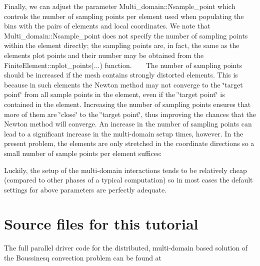 \begin{DoxyItemize}
\item Finally, we can adjust the parameter {\ttfamily Multi\+\_\+domain\+::\+Nsample\+\_\+point} which controls the number of sampling points per element used when populating the bins with the pairs of elements and local coordinates. We note that {\ttfamily Multi\+\_\+domain\+::\+Nsample\+\_\+point} does not specify the number of sampling points within the element directly; the sampling points are, in fact, the same as the element\textquotesingle{}s plot points and their number may be obtained from the {\ttfamily Finite\+Element\+::nplot\+\_\+points}(...) function. ~\newline
~\newline
 The number of sampling points should be increased if the mesh contains strongly distorted elements. This is because in such elements the Newton method may not converge to the \char`\"{}target point\char`\"{} from all sample points in the element, even if the \char`\"{}target point\char`\"{} is contained in the element. Increasing the number of sampling points ensures that more of them are \char`\"{}close\char`\"{} to the \char`\"{}target point\char`\"{}, thus improving the chances that the Newton method will converge. An increase in the number of sampling points can lead to a significant increase in the multi-\/domain setup times, however. In the present problem, the elements are only stretched in the coordinate directions so a small number of sample points per element suffices\+: ~\newline
~\newline
  
\begin{DoxyCodeInclude}

\end{DoxyCodeInclude}

\end{DoxyItemize}

Luckily, the setup of the multi-\/domain interactions tends to be relatively cheap (compared to other phases of a typical computation) so in most cases the default settings for above parameters are perfectly adequate.



 

\hypertarget{index_sources}{}\section{Source files for this tutorial}\label{index_sources}
The full parallel driver code for the distributed, multi-\/domain based solution of the Boussinesq convection problem can be found at

